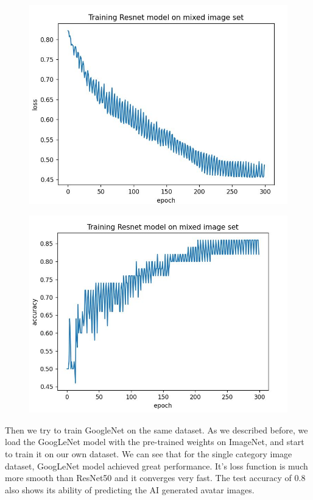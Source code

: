 \documentclass[conference]{IEEEtran}
\begin{document}
\begin{figure}[h]
  \centering
    \begin{minipage}{.24\textwidth}
      \centering
      \includegraphics[width=0.9\linewidth]{resnet_ganyu_loss.jpg}
      \label{fig:test1}
    \end{minipage}%
    \begin{minipage}{.24\textwidth}
      \centering
      \includegraphics[width=0.9\linewidth]{resnet_ganyu_accuracy.jpg}
      \label{fig:test2}
    \end{minipage}
\end{figure}

Then we try to train GoogleNet on the same dataset. As we described before, we load the GoogLeNet model with the pre-trained weights on ImageNet, and start to train it on our own dataset. We can see that for the single category image dataset, GoogLeNet model achieved great performance. It's loss function is much more smooth than ResNet50 and it converges very fast. The test
accuracy of 0.8 also shows its ability of predicting the AI generated avatar images.
\end{document}
